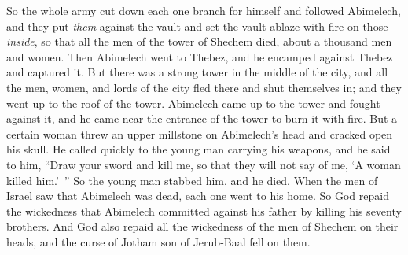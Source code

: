 \begin{biblechapter}
\verse So the whole army cut down each one branch for himself and followed Abimelech, and they put \textit{them} against the vault and set the vault ablaze with fire on those \textit{inside}, so that all the men of the tower of Shechem died, about a thousand men and women.
\verse Then Abimelech went to Thebez, and he encamped against Thebez and captured it.
\verse But there was a strong tower in the middle of the city, and all the men, women, and lords of the city fled there and shut themselves in; and they went up to the roof of the tower.
\verse Abimelech came up to the tower and fought against it, and he came near the entrance of the tower to burn it with fire.
\verse But a certain woman threw an upper millstone on Abimelech’s head and cracked open his skull.
\verse He called quickly to the young man carrying his weapons, and he said to him, “Draw your sword and kill me, so that they will not say of me, ‘A woman killed him.’ ” So the young man stabbed him, and he died.
\verse When the men of Israel saw that Abimelech was dead, each one went to his home.
\verse So God repaid the wickedness that Abimelech committed against his father by killing his seventy brothers.
\verse And God also repaid all the wickedness of the men of Shechem on their heads, and the curse of Jotham son of Jerub-Baal fell on them.
\end{biblechapter}

